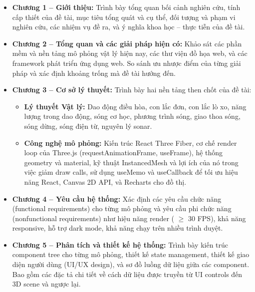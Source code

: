 \begin{itemize}
    \item \textbf{Chương 1 – Giới thiệu:} Trình bày tổng quan bối cảnh nghiên cứu, tính cấp thiết của đề tài, mục tiêu tổng quát và cụ thể, đối tượng và phạm vi nghiên cứu, các nhiệm vụ đề ra, và ý nghĩa khoa học – thực tiễn của đề tài.
    
    \item \textbf{Chương 2 – Tổng quan và các giải pháp hiện có:} Khảo sát các phần mềm và nền tảng mô phỏng vật lý hiện nay, các thư viện đồ họa web, và các framework phát triển ứng dụng web. So sánh ưu nhược điểm của từng giải pháp và xác định khoảng trống mà đề tài hướng đến.
    
    \item \textbf{Chương 3 – Cơ sở lý thuyết:} Trình bày hai nền tảng then chốt của đề tài:
    \begin{itemize}
        \item \textbf{Lý thuyết Vật lý:} Dao động điều hòa, con lắc đơn, con lắc lò xo, năng lượng trong dao động, sóng cơ học, phương trình sóng, giao thoa sóng, sóng dừng, sóng điện từ, nguyên lý sonar.
        \item \textbf{Công nghệ mô phỏng:} Kiến trúc React Three Fiber, cơ chế render loop của Three.js (requestAnimationFrame, useFrame), hệ thống geometry và material, kỹ thuật InstancedMesh và lợi ích của nó trong việc giảm draw calls, sử dụng useMemo và useCallback để tối ưu hiệu năng React, Canvas 2D API, và Recharts cho đồ thị.
    \end{itemize}
    
    \item \textbf{Chương 4 – Yêu cầu hệ thống:} Xác định các yêu cầu chức năng (functional requirements) cho từng mô phỏng và yêu cầu phi chức năng (non\-functional requirements) như hiệu năng render ( $\geq$ 30 FPS), khả năng responsive, hỗ trợ dark mode, khả năng chạy trên nhiều trình duyệt.
    
    \item \textbf{Chương 5 – Phân tích và thiết kế hệ thống:} Trình bày kiến trúc component tree cho từng mô phỏng, thiết kế state management, thiết kế giao diện người dùng (UI/UX design), và sơ đồ luồng dữ liệu giữa các component. Bao gồm các đặc tả chi tiết về cách dữ liệu được truyền từ UI controls đến 3D scene và ngược lại.
    

\end{itemize}
